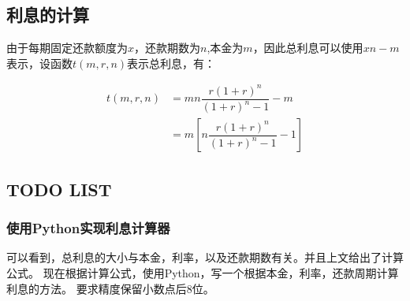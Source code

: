 \documentclass[a4paper, 12pt, draft]{article}
\begin{document}
\newpage
\subsection{利息的计算}
由于每期固定还款额度为$x$，还款期数为$n$,本金为$m$，因此总利息可以使用$xn-m$表示，设函数$t(m, r, n)$表示总利息，有：

\begin{equation}
    \begin{aligned}
        t(m, r, n) & = m n \dfrac{ r (1 + r)^n }{ (1 + r)^n - 1 } - m     \\
                   & = m [ n \dfrac{ r (1 + r)^n }{ (1 + r)^n - 1 } - 1 ]
    \end{aligned}
\end{equation}

\subsection{TODO LIST}
\subsubsection{使用Python实现利息计算器}
可以看到，总利息的大小与本金，利率，以及还款期数有关。并且上文给出了计算公式。
现在根据计算公式，使用Python，写一个根据本金，利率，还款周期计算利息的方法。
要求精度保留小数点后8位。
\end{document}
